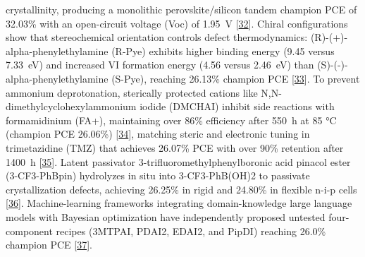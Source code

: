\documentclass[
  11pt,
]{article}
\begin{document}
crystallinity, producing a monolithic perovskite/silicon tandem champion
PCE of 32.03\% with an open-circuit voltage (Voc) of \qty{1.95}{\volt}
{[}\href{https://doi.org/10.1021/acsami.6c01711}{32}{]}. Chiral
configurations show that stereochemical orientation controls defect
thermodynamics: (R)-(+)-alpha-phenylethylamine (R-Pye) exhibits higher
binding energy (9.45 versus \qty{7.33}{\electronvolt}) and increased VI
formation energy (4.56 versus \qty{2.46}{\electronvolt}) than
(S)-(-)-alpha-phenylethylamine (S-Pye), reaching 26.13\% champion PCE
{[}\href{https://doi.org/10.1002/aenm.71222}{33}{]}. To prevent ammonium
deprotonation, sterically protected cations like
N,N-dimethylcyclohexylammonium iodide (DMCHAI) inhibit side reactions
with formamidinium (FA+), maintaining over 86\% efficiency after
\qty{550}{\hour} at 85 °C (champion PCE 26.06\%)
{[}\href{https://doi.org/10.1021/acsami.6c04956}{34}{]}, matching steric
and electronic tuning in trimetazidine (TMZ) that achieves 26.07\% PCE
with over 90\% retention after \qty{1400}{\hour}
{[}\href{https://doi.org/10.1002/adfm.75743}{35}{]}. Latent passivator
3-trifluoromethylphenylboronic acid pinacol ester (3-CF3-PhBpin)
hydrolyzes in situ into 3-CF3-PhB(OH)2 to passivate crystallization
defects, achieving 26.25\% in rigid and 24.80\% in flexible n-i-p cells
{[}\href{https://doi.org/10.1002/adfm.75370}{36}{]}. Machine-learning
frameworks integrating domain-knowledge large language models with
Bayesian optimization have independently proposed untested
four-component recipes (3MTPAI, PDAI2, EDAI2, and PipDI) reaching 26.0\%
champion PCE {[}\href{https://doi.org/10.48550/arxiv.2602.04914}{37}{]}.
\end{document}
